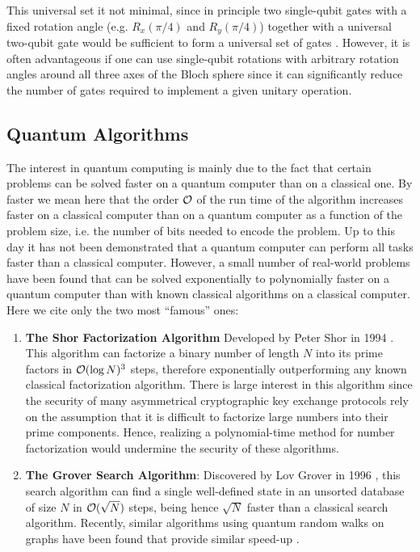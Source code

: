 This universal set it not minimal, since in principle two single-qubit gates with a fixed rotation angle (e.g. $R_x(\pi/4)$ and $R_y(\pi/4)$) together with a universal two-qubit gate would be sufficient to form a universal set of gates \citep{dawson_solovay-kitaev_2005}. However, it is often advantageous if one can use single-qubit rotations with arbitrary rotation angles around all three axes of the Bloch sphere since it can significantly reduce the number of gates required to implement a given unitary operation.

\subsection{Quantum Algorithms}

The interest in quantum computing is mainly due to the fact that certain problems can be solved faster on a quantum computer than on a classical one. By faster we mean here that the order $\cal{O}$ of the run time of the algorithm increases faster on a classical computer than on a quantum computer as a function of the problem size, i.e. the number of bits needed to encode the problem. Up to this day it has not been demonstrated that a quantum computer can perform all tasks faster than a classical computer. However, a small number of real-world problems have been found that can be solved exponentially to polynomially faster on a quantum computer than with known classical algorithms on a classical computer. Here we cite only the two most ``famous'' ones:

\begin{enumerate}
\item \textbf{The Shor Factorization Algorithm} Developed by Peter Shor in 1994 \citep{shor_algorithms_1994,shor_polynomial-time_1995}. This algorithm can factorize a binary number of length $N$ into its prime factors in $\begin{mathcal}O\end{mathcal}(\log{N})^3$ steps, therefore exponentially outperforming any known classical factorization algorithm. There is large interest in this algorithm since the security of many asymmetrical cryptographic key exchange protocols rely on the assumption that it is difficult to factorize large numbers into their prime components. Hence, realizing a polynomial-time method for number factorization would undermine the security of these algorithms.
\item \textbf{The Grover Search Algorithm}: Discovered by Lov Grover in 1996 \citep{grover_fast_1996}, this search algorithm can find a single well-defined state in an unsorted database of size $N$ in $\begin{mathcal}O\end{mathcal}(\sqrt{N})$ steps, being hence $\sqrt{N}$ faster than a classical search algorithm. Recently, similar algorithms using quantum random walks on graphs have been found that provide similar speed-up \citep{shenvi_quantum_2003}.
\end{enumerate}


